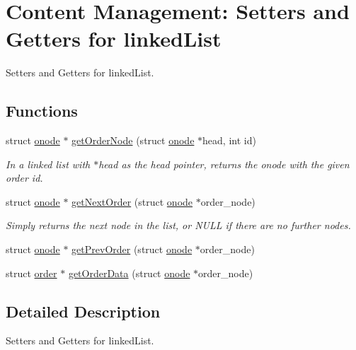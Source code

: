 \hypertarget{group__group1}{\section{Content Management\-: Setters and Getters for linked\-List}
\label{group__group1}
}


Setters and Getters for linked\-List.  


\subsection*{Functions}
\begin{DoxyCompactItemize}
\item 
struct \hyperlink{structonode}{onode} $\ast$ \hyperlink{group__group1_gafd94ea6b6cb1035da16a95976a484ec8}{get\-Order\-Node} (struct \hyperlink{structonode}{onode} $\ast$head, int id)
\begin{DoxyCompactList}\small\item\em In a linked list with $\ast$head as the head pointer, returns the onode with the given order id. \end{DoxyCompactList}\item 
struct \hyperlink{structonode}{onode} $\ast$ \hyperlink{group__group1_gace9faaeb801bbdf650d93f4a8b075c4c}{get\-Next\-Order} (struct \hyperlink{structonode}{onode} $\ast$order\-\_\-node)
\begin{DoxyCompactList}\small\item\em Simply returns the next node in the list, or N\-U\-L\-L if there are no further nodes. \end{DoxyCompactList}\item 
struct \hyperlink{structonode}{onode} $\ast$ \hyperlink{group__group1_ga9960b22010f913d546f29222e8fe71c1}{get\-Prev\-Order} (struct \hyperlink{structonode}{onode} $\ast$order\-\_\-node)
\item 
struct \hyperlink{structorder}{order} $\ast$ \hyperlink{group__group1_ga926f037e453969ff428e61cf5d0300ac}{get\-Order\-Data} (struct \hyperlink{structonode}{onode} $\ast$order\-\_\-node)
\end{DoxyCompactItemize}


\subsection{Detailed Description}
Setters and Getters for linked\-List. 


